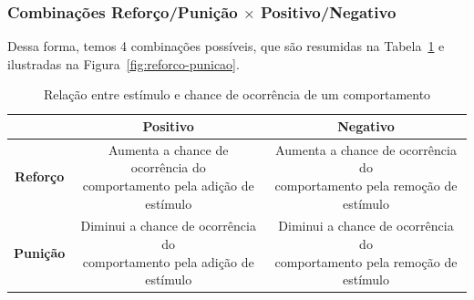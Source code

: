 \documentclass{article}
\begin{document}
            \subsubsection{Combinações Reforço/Punição \texorpdfstring{$\times$}{TEXT} Positivo/Negativo}
            
                Dessa forma, temos 4 combinações possíveis, que são resumidas na Tabela~\ref{tab:reforco-punicao} e ilustradas na Figura~\ref{fig:reforco-punicao}.
            
                \begin{table}[ht]
                    \centering
                    \begin{tabular}{|c|c|c|}
                        \hline
                         & \textbf{Positivo} & \textbf{Negativo} \\
                        \hline
                        \textbf{Reforço} & \makecell{Aumenta a chance de ocorrência do \\ comportamento pela adição de estímulo} & \makecell{Aumenta a chance de ocorrência do \\ comportamento pela remoção de estímulo} \\
                        \hline
                        \textbf{Punição} & \makecell{Diminui a chance de ocorrência do \\ comportamento pela adição de estímulo} & \makecell{Diminui a chance de ocorrência do \\ comportamento pela remoção de estímulo} \\
                        \hline
                    \end{tabular}
                    \caption{Relação entre estímulo e chance de ocorrência de um comportamento}
                    \label{tab:reforco-punicao}
                \end{table}
            
\end{document}
